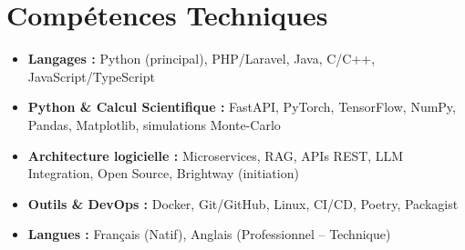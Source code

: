 \documentclass[a4paper,11pt]{article}
\begin{document}
\section{Compétences Techniques}
\begin{itemize}[leftmargin=*, nosep]
    \item \small{\textbf{Langages :} Python (principal), PHP/Laravel, Java, C/C++, JavaScript/TypeScript}
    \item \small{\textbf{Python \& Calcul Scientifique :} FastAPI, PyTorch, TensorFlow, NumPy, Pandas, Matplotlib, simulations Monte-Carlo}
    \item \small{\textbf{Architecture logicielle :} Microservices, RAG, APIs REST, LLM Integration, Open Source, Brightway (initiation)}
    \item \small{\textbf{Outils \& DevOps :} Docker, Git/GitHub, Linux, CI/CD, Poetry, Packagist}
    \item \small{\textbf{Langues :} Français (Natif), Anglais (Professionnel -- Technique)}
\end{itemize}

\end{document}
